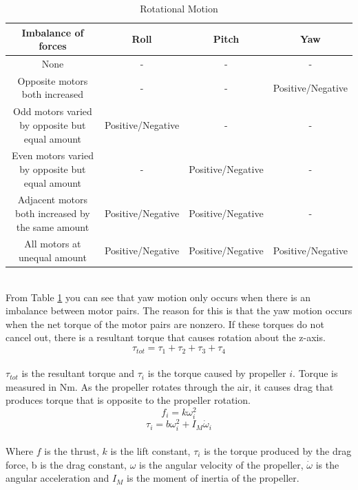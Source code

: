 \begin{table}[h]
\centering
\begin{tabular}{ |c|c|c|c| } 
 \hline \rowcolor{white}
 \textbf{Imbalance of forces} & \textbf{Roll} & \textbf{Pitch} & \textbf{Yaw} \\
 \hline
 None & - & - & - \\ 
 Opposite motors both increased & - & - & Positive/Negative \\ 
 Odd motors varied by opposite but equal amount & Positive/Negative & - & - \\ 
 Even motors varied by opposite but equal amount & - & Positive/Negative & - \\ 
 Adjacent motors both increased by the same amount & Positive/Negative & Positive/Negative & - \\ 
 All motors at unequal amount & Positive/Negative & Positive/Negative & Positive/Negative \\ 
 \hline
\end{tabular}
\caption{Rotational Motion}
\label{tabular:rotmot}
\end{table} \\
\noindent
From Table \ref{tabular:rotmot} you can see that yaw motion only occurs when there is an imbalance between motor pairs. The reason for this is that the yaw motion occurs when the net torque of the motor pairs are nonzero. If these torques do not cancel out, there is a resultant torque that causes rotation about the z-axis. 
\begin{equation}
\tau_{tot} = \tau_1 + \tau_2 + \tau_3 + \tau_4
\end{equation}
\\
$\tau_{tot}$ is the resultant torque and $\tau_i$ is the torque caused by propeller $i$. Torque is measured in Nm. As the propeller rotates through the air, it causes drag that produces torque that is opposite to the propeller rotation. 
\begin{equation}
f_i = k\omega_i^2
\end{equation}
\begin{equation}
\tau_i = b\omega_i^2 + I_M\dot{\omega}_i
\end{equation}
\\
Where $f$ is the thrust, $k$ is the lift constant, $\tau_i$ is the torque produced by the drag force, b is the drag constant, $\omega$ is the angular velocity of the propeller, $\dot{\omega}$ is the angular acceleration and $I_M$ is the moment of inertia of the propeller. 
\\\\
